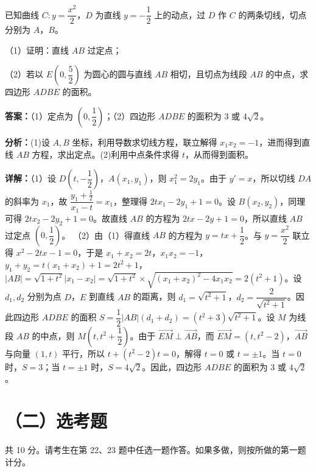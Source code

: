 \begin{question}[points=12]
已知曲线 $C: y=\dfrac{x^2}{2}$，$D$ 为直线 $y=-\dfrac{1}{2}$ 上的动点，过 $D$ 作 $C$ 的两条切线，切点分别为 $A$，$B$。

（1）证明：直线 $AB$ 过定点；

（2）若以 $E\left(0,\dfrac{5}{2}\right)$ 为圆心的圆与直线 $AB$ 相切，且切点为线段 $AB$ 的中点，求四边形 $ADBE$ 的面积。
\begin{solution}
\textbf{答案：}（1）定点为 $\left(0,\dfrac{1}{2}\right)$；（2）四边形 $ADBE$ 的面积为 $3$ 或 $4\sqrt{2}$。

\textbf{分析：}(1)设 $A,B$ 坐标，利用导数求切线方程，联立解得 $x_1x_2=-1$，进而得到直线 $AB$ 方程，求出定点。(2)利用中点条件求得 $t$，从而得到面积。

\textbf{详解：}（1）设 $D\left(t,-\dfrac{1}{2}\right)$，$A(x_1,y_1)$，则 $x_1^2=2y_1$。由于 $y'=x$，所以切线 $DA$ 的斜率为 $x_1$，故 $\dfrac{y_1+\frac{1}{2}}{x_1-t}=x_1$，整理得 $2tx_1-2y_1+1=0$。设 $B(x_2,y_2)$，同理可得 $2tx_2-2y_2+1=0$。故直线 $AB$ 的方程为 $2tx-2y+1=0$，所以直线 $AB$ 过定点 $\left(0,\dfrac{1}{2}\right)$。
（2）由（1）得直线 $AB$ 的方程为 $y=tx+\dfrac{1}{2}$。与 $y=\dfrac{x^2}{2}$ 联立得 $x^2-2tx-1=0$，于是 $x_1+x_2=2t$，$x_1x_2=-1$，$y_1+y_2=t(x_1+x_2)+1=2t^2+1$，$|AB|=\sqrt{1+t^2}|x_1-x_2|=\sqrt{1+t^2}\times\sqrt{(x_1+x_2)^2-4x_1x_2}=2(t^2+1)$。设 $d_1,d_2$ 分别为点 $D$，$E$ 到直线 $AB$ 的距离，则 $d_1=\sqrt{t^2+1}$，$d_2=\dfrac{2}{\sqrt{t^2+1}}$。因此四边形 $ADBE$ 的面积 $S=\dfrac{1}{2}|AB|(d_1+d_2)=(t^2+3)\sqrt{t^2+1}$。设 $M$ 为线段 $AB$ 的中点，则 $M\left(t,t^2+\dfrac{1}{2}\right)$。由于 $\overrightarrow{EM}\perp\overrightarrow{AB}$，而 $\overrightarrow{EM}=(t,t^2-2)$，$\overrightarrow{AB}$ 与向量 $(1,t)$ 平行，所以 $t+(t^2-2)t=0$，解得 $t=0$ 或 $t=\pm1$。当 $t=0$ 时，$S=3$；当 $t=\pm1$ 时，$S=4\sqrt{2}$。因此，四边形 $ADBE$ 的面积为 $3$ 或 $4\sqrt{2}$。
\end{solution}
\end{question}

\section*{（二）选考题}
共 10 分。请考生在第 22、23 题中任选一题作答。如果多做，则按所做的第一题计分。

